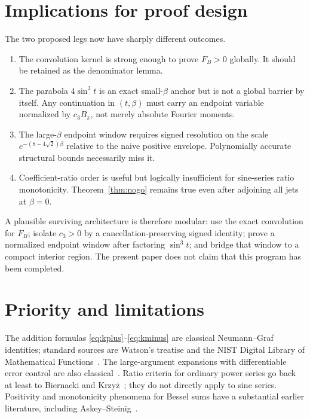 \documentclass[11pt]{article}
\theoremstyle{definition}
\theoremstyle{remark}
\newcommand{\FB}{F_{\!B}}
\begin{document}
\section{Implications for proof design}

The two proposed legs now have sharply different outcomes.
\begin{enumerate}
\item The convolution kernel is strong enough to prove $\FB>0$ globally.
It should be retained as the denominator lemma.
\item The parabola $4\sin^3t$ is an exact small-$\beta$ anchor but is not a
global barrier by itself.  Any continuation in $(t,\beta)$ must carry an
endpoint variable normalized by $c_3B_\pi$, not merely absolute Fourier
moments.
\item The large-$\beta$ endpoint window requires signed resolution on the
scale $e^{-(8-4\sqrt2)\beta}$ relative to the naive positive envelope.
Polynomially accurate structural bounds necessarily miss it.
\item Coefficient-ratio order is useful but logically insufficient for
sine-series ratio monotonicity.  Theorem~\ref{thm:nogo} remains true even
after adjoining all jets at $\beta=0$.
\end{enumerate}

A plausible surviving architecture is therefore modular: use the exact
convolution for $\FB$; isolate $c_3>0$ by a cancellation-preserving signed
identity; prove a normalized endpoint window after factoring $\sin^3t$;
and bridge that window to a compact interior region.  The present paper
does not claim that this program has been completed.

\section{Priority and limitations}

The addition formulas \eqref{eq:kplus}--\eqref{eq:kminus} are classical
Neumann--Graf identities; standard sources are Watson's treatise and the
NIST Digital Library of Mathematical Functions~\cite{DLMFaddition,Watson}.
The large-argument expansions with differentiable error control are also
classical~\cite{DLMFasymptotic,Olver}.  Ratio criteria for ordinary power
series go back at least to Biernacki and Krzy\.z~\cite{BK}; they do not
directly apply to sine series.  Positivity and monotonicity phenomena for
Bessel sums have a substantial earlier literature, including
Askey--Steinig~\cite{AskeySteinig}.
\end{document}
